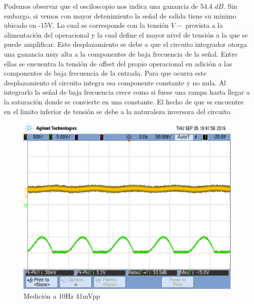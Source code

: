 Podemos observar que el osciloscopio nos indica una ganancia de 54.4 $dB$. Sin embargo, si vemos con mayor detenimiento la señal de salida tiene su mínimo ubicado en -15V. Lo cual se corresponde con la tensión $V-$ provista a la alimentación del operacional y la cual define el mayor nivel de tensión a la que se puede amplificar.
Este desplazamiento se debe a que el circuito integrador otorga una ganancia muy alta a la componentes de baja frecuencia de la señal. Entre ellas se encuentra la tensión de offset del  propio operacional en adición a las componentes de baja frecuencia de la entrada. Para que ocurra este desplazamiento el circuito integra esa componente constante y no nula. Al integrarlo la señal de baja frecuencia crece como si fuese una rampa hasta llegar a la saturación donde se convierte en una constante. El hecho de que se encuentre en el limito inferior de tensión se debe a la naturaleza inversora del circuito. 
\begin{figure}[H]
	\centering
	\includegraphics[width=\textwidth]{Ejercicio4/FOTOS-TP2-TC-EJ4/piso}
	\caption{Medición a 10Hz 41mVpp}
\end{figure}

